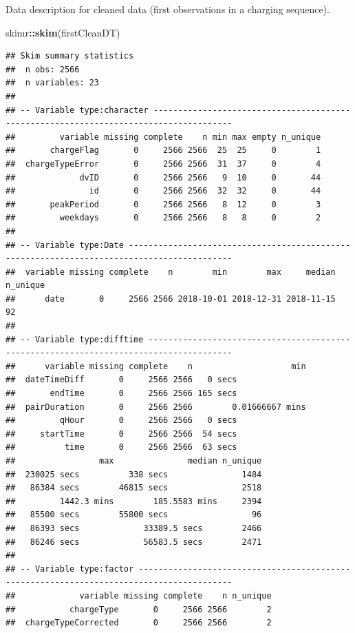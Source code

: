 \documentclass[]{article}
\newenvironment{Shaded}{\begin{snugshade}}{\end{snugshade}}
\newcommand{\KeywordTok}[1]{\textcolor[rgb]{0.13,0.29,0.53}{\textbf{#1}}}
\newcommand{\NormalTok}[1]{#1}
\newcommand{\OperatorTok}[1]{\textcolor[rgb]{0.81,0.36,0.00}{\textbf{#1}}}
\begin{document}
Data description for cleaned data (first observations in a charging sequence).

\begin{Shaded}
\begin{Highlighting}[]
\NormalTok{skimr}\OperatorTok{::}\KeywordTok{skim}\NormalTok{(firstCleanDT)}
\end{Highlighting}
\end{Shaded}

\begin{verbatim}
## Skim summary statistics
##  n obs: 2566 
##  n variables: 23 
## 
## -- Variable type:character --------------------------------------------------------------------------------------
##         variable missing complete    n min max empty n_unique
##       chargeFlag       0     2566 2566  25  25     0        1
##  chargeTypeError       0     2566 2566  31  37     0        4
##             dvID       0     2566 2566   9  10     0       44
##               id       0     2566 2566  32  32     0       44
##       peakPeriod       0     2566 2566   8  12     0        3
##         weekdays       0     2566 2566   8   8     0        2
## 
## -- Variable type:Date -------------------------------------------------------------------------------------------
##  variable missing complete    n        min        max     median n_unique
##      date       0     2566 2566 2018-10-01 2018-12-31 2018-11-15       92
## 
## -- Variable type:difftime ---------------------------------------------------------------------------------------
##      variable missing complete    n                    min
##  dateTimeDiff       0     2566 2566   0 secs              
##       endTime       0     2566 2566 165 secs              
##  pairDuration       0     2566 2566        0.01666667 mins
##         qHour       0     2566 2566   0 secs              
##     startTime       0     2566 2566  54 secs              
##          time       0     2566 2566  63 secs              
##                 max               median n_unique
##  230025 secs          338 secs               1484
##   86384 secs        46815 secs               2518
##         1442.3 mins        185.5583 mins     2394
##   85500 secs        55800 secs                 96
##   86393 secs             33389.5 secs        2466
##   86246 secs             56583.5 secs        2471
## 
## -- Variable type:factor -----------------------------------------------------------------------------------------
##             variable missing complete    n n_unique
##           chargeType       0     2566 2566        2
##  chargeTypeCorrected       0     2566 2566        2

\end{verbatim}
\end{document}
